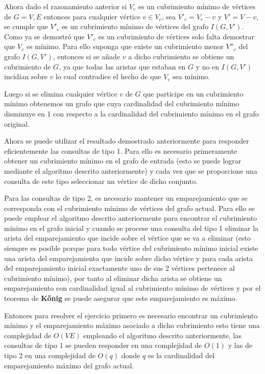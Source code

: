 \documentclass{article}
\begin{document}
Ahora dado el razonamiento anterior si $V_c$ es un cubrimiento mínimo de vértices de $G = V, E$ entonces para cualquier vértice $v \in V_c$, sea $V'_c=V_c - v$
y $V'= V-v$, se cumple que $V'_c$ es un cubrimiento mínimo de vértices del grafo $I(G,V')$. Como ya se demostró que $V'_c$ es un cubrimiento de vértices
solo falta demostrar que $V_c$ es mínimo. Para ello suponga que existe un cubrimiento menor $V''_c$ del grafo $I(G,V')$, entonces si se añade $v$ a dicho
cubrimiento se obtiene un cubrimiento de $G$, ya que todas las aristas que estaban en $G$ y no en $I(G,V')$ incidían sobre
$v$ lo cual contradice el hecho de que $V_c$ sea mínimo.

Luego si se elimina cualquier vértice $v$ de $G$ que participe en un cubrimiento mínimo obtenemos un grafo que cuya cardinalidad del cubrimiento mínimo disminuye en 1
con respecto a la cardinalidad del cubrimiento mínimo en el grafo original.

Ahora se puede utilizar el resultado demostrado anteriormente para responder eficientemente las consultas de tipo 1. Para ello es necesario
primeramente obtener un cubrimiento mínimo en el grafo de entrada (esto se puede lograr mediante el algoritmo descrito anteriormente)
y cada vez que se proporcione una consulta de este tipo seleccionar un vértice de dicho conjunto.

Para las consultas de tipo 2, es necesario mantener un emparejamiento que se corresponda con el cubrimiento mínimo de vértices del grafo actual.
Para ello se puede emplear el algoritmo descrito anteriormente para encontrar el cubrimiento mínimo en el grafo inicial
y cuando se procese una consulta del tipo 1 eliminar la arista del emparejamiento que incide sobre el vértice que se va a eliminar (esto siempre
es posible porque para todo vértice del cubrimiento mínimo inicial existe una arista del emparejamiento que incide sobre dicho vértice
y para cada arista del emparejamiento inicial exactamente uno de sus 2 vértices pertenece al cubrimiento mínimo), por tanto al eliminar dicha arista
se obtiene un emparejamiento con cardinalidad igual al cubrimiento mínimo de vértices y por el teorema de \textbf{Kőnig} se puede asegurar
que este emparejamiento es máximo.

Entonces para resolver el ejercicio primero es necesario encontrar un cubrimiento mínimo y el emparejamiento máximo asociado a dicho cubrimiento
esto tiene una complejidad de $O(VE)$ empleando el algoritmo descrito anteriormente, las consultas de tipo 1 se pueden responder en una
complejidad de $O(1)$ y las de tipo 2 en una complejidad de $O(q)$ donde $q$ es la cardinalidad del emparejamiento máximo del grafo actual.
\end{document}

